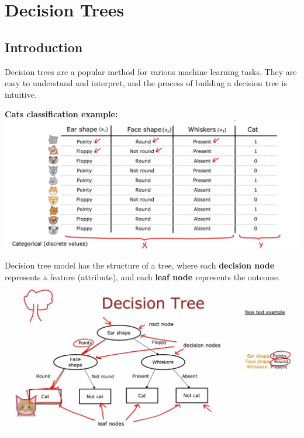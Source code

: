 \chapter{Decision Trees}
\section{Introduction}
Decision trees are a popular method for various machine learning tasks. 
They are easy to understand and interpret, and the process of building a decision tree is intuitive.
\par
\noindent
{\large \textbf{Cats classification example:}}
\\
\includegraphics[width=\textwidth]{images/11.1}
\par
Decision tree model has the structure of a tree,
where each \textbf{decision node} represents a feature (attribute),  
and each \textbf{leaf node} represents the outcome.\\
\includegraphics[width=\textwidth]{images/11.2}
\par
